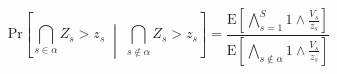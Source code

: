 \begin{comment}
    \begin{itemize}
        \item Description of joint maxima problem/application
        \item Estimation of the extremal dependence structure
        \begin{itemize}
            \item Following the example of \cite{trubey:pg}, ...
            \item Probability of extreme local inundation given current
                inundation field.
                \begin{equation*}
                    \begin{aligned}
                    P\left(Z_{s} \geq z_{s} \mid \bm{Z}_{\neg s} \geq \bm{z}_{\neg s}\right)
                        &= P\left(RV_{s} \geq rv{s} \mid RV_{\neg s} \geq rv_{\neq s}\right)\\
                        &= P\left(R\geq r\right)P\left(V_{s}\geq v_{s}\mid )
                    \end{aligned}
                \end{equation*}
        \end{itemize}
        \item Multi-site return levels
        \begin{itemize}
            \item Total Inundation field?  (some univariate transformation?)
            \item number of locales under significant flooding?
        \end{itemize}
        \item Application results
    \end{itemize}
\end{comment}



\begin{equation}
    \text{Pr}\left[\bigcap_{s\in\alpha}Z_s > z_s\;\middle|\;\bigcap_{s\not\in\alpha}Z_s > z_s\right] =
    \frac{
        \text{E}\left[\bigwedge_{s=1}^S 1\wedge \frac{V_s}{z_s}\right]
    }{
        \text{E}\left[\bigwedge_{s\not\in\alpha} 1\wedge \frac{V_s}{z_s}\right]
    }    
\end{equation}






